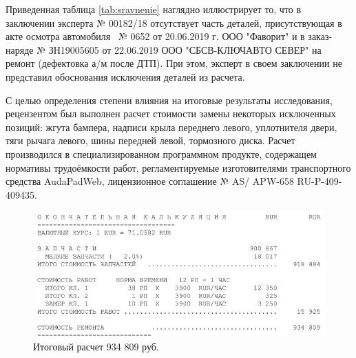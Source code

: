 Приведенная таблица \ref*{tab:sravnenie}  наглядно иллюстрирует то, что в заключении эксперта № 00182/18 отсутствует часть деталей, присутствующая в акте осмотра  автомобиля  \, № 0652 от 20.06.2019 г. ООО "Фаворит" и в заказ-наряде № ЗН19005605 от 22.06.2019 ООО "СБСВ-КЛЮЧАВТО СЕВЕР" на ремонт (дефектовка а/м после ДТП). При этом, эксперт  в своем заключении не представил обоснования исключения деталей из расчета.
\par С целью определения степени влияния на итоговые результаты исследования,  рецензентом был выполнен расчет стоимости замены некоторых  исключенных позиций: жгута бампера, надписи крыла переднего левого, уплотнителя двери, тяги рычага левого, шины передней левой, тормозного диска. Расчет производился   в специализированном программном продукте, содержащем нормативы трудоёмкости работ, регламентируемые изготовителями транспортного средства     AudaPadWeb, лицензионное соглашение № AS/\- APW-658  RU-P-409-409435. \\[3mm]
%
% 
\begin{figure}[H]
	\centering
	\includegraphics[width=0.8\linewidth]{images/itog}
	\caption[]{Итоговый расчет 934 809 руб.}
	\label{fig:itog}
\end{figure}


